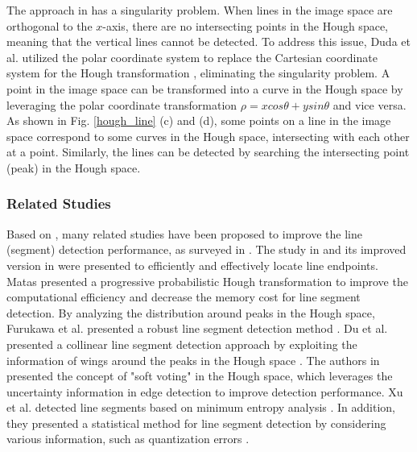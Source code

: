 \documentclass[journal,compsoc]{IEEEtran}
\begin{document}
The approach in \cite{METHODANDMEANSFORRECOGNIZINGCOMPLEXPATTERNS} has a singularity problem. When lines in the image space are orthogonal to the $x$-axis, there are no intersecting points in the Hough space, meaning that the vertical lines cannot be detected. To address this issue, Duda et al. utilized the polar coordinate system to replace the Cartesian coordinate system for the Hough transformation \cite{UseoftheHoughTransformationtoDetectLinesandCurvesinPictures}, eliminating the singularity problem. A point in the image space can be transformed into a curve in the Hough space by leveraging the polar coordinate transformation $\rho = x cos \theta + y sin \theta$ and vice versa. As shown in Fig. \ref{hough_line} (c) and (d), some points on a line in the image space correspond to some curves in the Hough space, intersecting with each other at a point. Similarly, the lines can be detected by searching the intersecting point (peak) in the Hough space.

\subsubsection{Related Studies}
Based on \cite{UseoftheHoughTransformationtoDetectLinesandCurvesinPictures}, many related studies have been proposed to improve the line (segment) detection performance, as surveyed in \cite{AsurveyofHoughTransform,Rahmdel2015ARO}. The study in \cite{CompletelinesegmentdescriptionusingtheHoughtransform} and its improved version in \cite{CompletedescriptionofmultiplelinesegmentsusingtheHoughtransform} were presented to efficiently and effectively locate line endpoints. Matas presented a progressive probabilistic Hough transformation to improve the computational efficiency and decrease the memory cost \cite{RobustDetectionofLinesUsingtheProgressiveProbabilisticHoughTransform} for line segment detection. By analyzing the distribution around peaks in the Hough space, Furukawa et al. presented a robust line segment detection method \cite{AccurateandRobustLineSegmentExtractionbyAnalyzingDistributionaroundPeaksinHoughSpace}. Du et al. presented a collinear line segment detection approach by exploiting the information of wings around the peaks in the Hough space \cite{CollinearSegmentDetectionUsingHTNeighborhoods}. The authors in \cite{AnAccurateMethodforLineDetectionandManhattanFrameEstimation} presented the concept of "soft voting" in the Hough space, which leverages the uncertainty information in edge detection to improve detection performance. Xu et al. detected line segments based on minimum entropy analysis \cite{AccurateandRobustLineSegmentExtractionUsingMinimumEntropyWithHoughTransform}. In addition, they presented a statistical method for line segment detection by considering various information, such as quantization errors \cite{AStatisticalMethodforLineSegmentDetection}.
\end{document}
